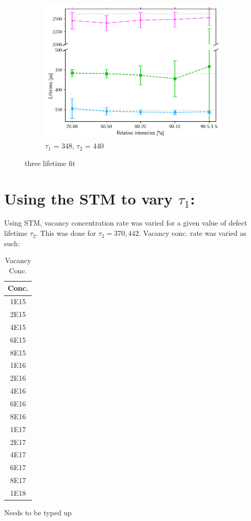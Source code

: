 \begin{figure}[p]
{        \begin{subfigure}{0.7\textwidth}
            \centering
            \includegraphics[width=0.95\linewidth]{Batch 7/348-440/output/3 life/lifetimes.png}
            \caption{$\tau_1$ = 348, $\tau_2$ = 440}
            \label{fig:3life_348}
        \end{subfigure}
    }
    \label{fig:3life}
    \caption{three lifetime fit} 
\end{figure}

\pagebreak

\section{Using the STM to vary $\tau_1$:}

Using STM, vacancy concentration rate was varied for a given value of defect lifetime $\tau_2$. This was done for $\tau_2 = 370,442$. Vacancy conc. rate was varied as such:

\begin{table}[h]
    \caption{Vacancy Conc.}
    \centering
    \begin{tabular}{|c|}
        \hline
        Conc. \\
        \hline
        1E15\\
        2E15\\
        4E15\\
        6E15\\
        8E15\\
        1E16\\
        2E16\\
        4E16\\
        6E16\\
        8E16\\
        1E17\\
        2E17\\
        4E17\\
        6E17\\
        8E17\\
        1E18\\
        \hline
    \end{tabular}
    \label{tab:vac-conc}
\end{table}

Needs to be typed up

